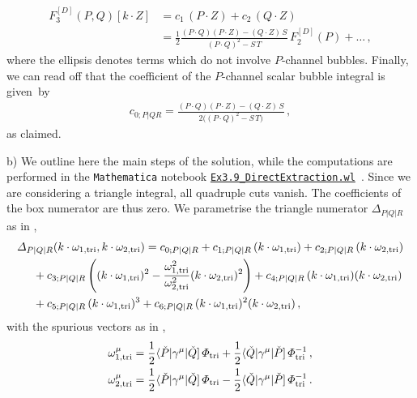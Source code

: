 \begin{align}
F_3^{[D]}(P,Q)[k\cdot Z] & = c_1 \, (P\cdot Z) + c_2 \, (Q\cdot Z) \nonumber \\
& = \frac{1}{2} \frac{(P\cdot Q) (P\cdot Z) -  (Q\cdot Z) \, S}{(P\cdot Q)^2-S \, T} \, F_2^{[D]}(P) + \ldots \,,
\end{align}
where the ellipsis denotes terms which do not involve $P$-channel bubbles.
Finally, we can read off that the coefficient of the $P$-channel scalar bubble integral is given~by
\begin{align} \label{eq:c0PQ_res}
c_{0;P|QR} = \frac{(P\cdot Q) (P\cdot Z) -  (Q\cdot Z) \, S}{2\bigl( (P\cdot Q)^2-S \, T \bigr) } \,,
\end{align}
as claimed.

\medskip
\noindent
b) We outline here the main steps of the solution, while the computations are performed in the \texttt{Mathematica} notebook \href{https://scattering-amplitudes.mpp.mpg.de/scattering-amplitudes-in-qft/Exercises/}{\texttt{Ex3.9\_DirectExtraction.wl}}~\cite{ch5-website}. Since we are considering a triangle integral, all quadruple cuts vanish. The coefficients of the box numerator are thus zero. We parametrise the triangle numerator $\Delta_{P|Q|R}$ as in ,
\begin{align} \begin{aligned}
& \Delta_{P|Q|R}(k\cdot \omega_{1,{\rm tri}}, k\cdot \omega_{2,{\rm tri}}) = c_{0;P|Q|R} + c_{1;P|Q|R} \, (k\cdot \omega_{1,{\rm tri}}) + c_{2;P|Q|R} \, (k\cdot \omega_{2,{\rm tri}}) \\
& \hspace{0.5cm} +  c_{3;P|Q|R} \left( (k\cdot \omega_{1,{\rm tri}})^2 - \frac{\omega_{1,{\rm tri}}^2}{\omega_{2,{\rm tri}}^2} (k\cdot \omega_{2,{\rm tri}})^2 \right) + c_{4;P|Q|R} \,  (k\cdot \omega_{1,{\rm tri}})  (k\cdot \omega_{2,{\rm tri}}) \\
& \hspace{0.5cm} + c_{5;P|Q|R} \,  (k\cdot \omega_{1,{\rm tri}})^3 + c_{6;P|Q|R} \,  (k\cdot \omega_{1,{\rm tri}})^2  (k\cdot \omega_{2,{\rm tri}}) \,,
\end{aligned} \end{align}
with the spurious vectors as in ,
 \begin{align}
  \omega_{1,{\rm tri}}^\mu &= \frac{1}{2}\spAB{\check{P}}{\gamma^\mu}{\check{Q}} \, \Phi_{\rm tri} + \frac{1}{2}\spAB{\check{Q}}{\gamma^\mu}{\check{P}} \, \Phi_{\rm tri}^{-1}\,,\\ 
  \omega_{2,{\rm tri}}^\mu &= \frac{1}{2}\spAB{\check{P}}{\gamma^\mu}{\check{Q}}  \, \Phi_{\rm tri} - \frac{1}{2}\spAB{\check{Q}}{\gamma^\mu}{\check{P}} \, \Phi_{\rm tri}^{-1} \,.
\end{align}
